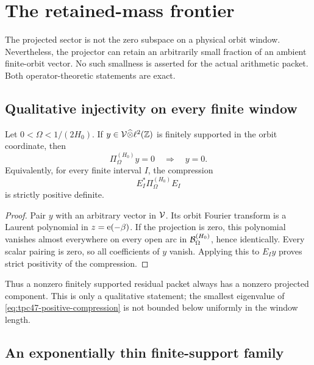 \section{The retained-mass frontier}
\label{sec:tpc47-mass-frontier}

The projected sector is not the zero subspace on a physical orbit
window.  Nevertheless, the projector can retain an arbitrarily small
fraction of an ambient finite-orbit vector.  No such smallness is
asserted for the actual arithmetic packet.  Both operator-theoretic
statements are exact.

\subsection{Qualitative injectivity on every finite window}

\begin{theorem}
\label{thm:tpc47-finite-support-injectivity}
Let \(0<\Omega<1/(2H_0)\).  If
\(y\in\mathcal V\widehat\otimes\ell^2(\mathbb Z)\) is finitely supported in the
orbit coordinate, then
\begin{equation}
 \Pi_{\Omega}^{(H_0)}y=0
 \quad\Longrightarrow\quad y=0.
 \label{eq:tpc47-finite-injectivity}
\end{equation}
Equivalently, for every finite interval \(I\), the compression
\begin{equation}
 E_I^*\Pi_{\Omega}^{(H_0)}E_I
 \label{eq:tpc47-positive-compression}
\end{equation}
is strictly positive definite.
\end{theorem}

\begin{proof}
Pair \(y\) with an arbitrary vector in \(\mathcal V\).  Its orbit Fourier
transform is a Laurent polynomial in \(z=\mathrm e(-\beta)\).  If the
projection is zero, this polynomial vanishes almost everywhere on every
open arc in \(\mathcal B_{\Omega}^{(H_0)}\), hence identically.  Every scalar
pairing is zero, so all coefficients of \(y\) vanish.  Applying this to
\(E_Iy\) proves strict positivity of the compression.
\end{proof}

Thus a nonzero finitely supported residual packet always has a nonzero
projected component.  This is only a qualitative statement; the
smallest eigenvalue of \eqref{eq:tpc47-positive-compression} is not
bounded below uniformly in the window length.

\subsection{An exponentially thin finite-support family}


